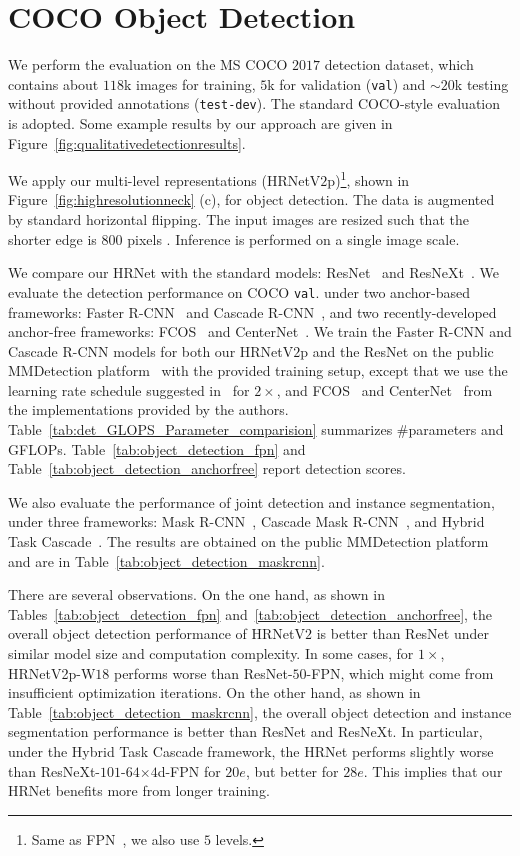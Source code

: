 \documentclass[10pt,journal,compsoc]{IEEEtran}
\begin{document}
\section{COCO Object Detection}
We perform the evaluation on the MS COCO $2017$ detection dataset,
which contains about $118$k images for training,
$5$k for validation (\texttt{val}) and $\sim20$k testing without provided annotations (\texttt{test-dev}).
The standard COCO-style evaluation is adopted.
Some example results 
by our approach
are given in Figure~\ref{fig:qualitativedetectionresults}.

We apply our multi-level representations (HRNetV$2$p)\footnote{Same as FPN~\cite{LinGGHD17}, 
we also use $5$ levels.},
shown in Figure~\ref{fig:highresolutionneck} (c), 
for object detection.
The data is augmented
by standard horizontal flipping. The input images are resized such that the shorter edge is 800 pixels \cite{LinDGHHB17}.
Inference is performed on a single image scale.


We compare our HRNet with the standard models: 
ResNet~\cite{HeZRS16} and ResNeXt~\cite{XieGDTH17}. 
We evaluate the detection performance
on COCO \texttt{val}.
under two anchor-based frameworks:
Faster R-CNN~\cite{RenHG017} and
Cascade R-CNN~\cite{CaiV18},
and two recently-developed
anchor-free frameworks: FCOS~\cite{TianSCH19}
and CenterNet~\cite{DuanBXQHT19}.
We train the Faster R-CNN 
and Cascade R-CNN models for both our HRNetV$2$p and the ResNet
on the public MMDetection platform~\cite{mmdetection}
with the provided training setup,
except that we use the learning rate schedule suggested in~\cite{DBLP:journals/corr/abs-1811-08883}
for $2\times$,
and FCOS~\cite{TianSCH19}
and CenterNet~\cite{DuanBXQHT19}
from the implementations provided by the authors.
Table~\ref{tab:det_GLOPS_Parameter_comparision}
summarizes \#parameters and GFLOPs.
Table~\ref{tab:object_detection_fpn}
and Table~\ref{tab:object_detection_anchorfree}
report detection scores.

We also evaluate the performance of joint detection and instance segmentation,
under three frameworks: 
Mask R-CNN~\cite{HeGDG17},
Cascade Mask R-CNN~\cite{CaiV19},
and Hybrid Task Cascade~\cite{ChenPWXLSFLSOLL19}.
The results
are 
obtained on the public MMDetection platform~\cite{mmdetection}
and
are in Table~\ref{tab:object_detection_maskrcnn}.

 
There are several observations.
On the one hand,
as shown in Tables~\ref{tab:object_detection_fpn}
and~\ref{tab:object_detection_anchorfree},
the overall object detection performance
of HRNetV$2$ is
better than ResNet
under similar model size and computation complexity.
In some cases,
for $1\times$,
HRNetV2p-W$18$ performs worse than ResNet-$50$-FPN,
which might come from insufficient optimization iterations.
On the other hand,
as shown in Table~\ref{tab:object_detection_maskrcnn},
the overall object detection and instance segmentation performance
is better than ResNet and ResNeXt.
In particular,
under the Hybrid Task Cascade framework,
the HRNet performs slightly worse than ResNeXt-$101$-$64$$\times$$4$d-FPN
for $20e$,
but better for $28e$.
This implies that our HRNet benefits more 
from longer training.
\end{document}
